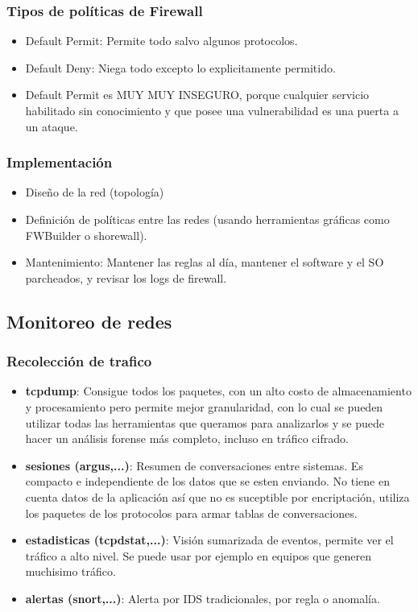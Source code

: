 \subsubsection{Tipos de políticas de Firewall}

\begin{itemize}
	\item Default Permit: Permite todo salvo algunos protocolos.
	\item Default Deny: Niega todo excepto lo explicitamente permitido.
	\item Default Permit es MUY MUY INSEGURO, porque cualquier servicio habilitado sin conocimiento y que posee
	una vulnerabilidad es una puerta a un ataque.
\end{itemize}

\subsubsection{Implementación}

\begin{itemize}
	\item Diseño de la red (topología)
	\item Definición de políticas entre las redes (usando herramientas gráficas como FWBuilder o shorewall).
	\item Mantenimiento: Mantener las reglas al día, mantener el software y el SO parcheados, y revisar los logs de firewall.
\end{itemize}

\subsection{Monitoreo de redes}

\subsubsection{Recolección de trafico}

\begin{itemize}
	\item \textbf{tcpdump}: Consigue todos los paquetes, con un alto costo de almacenamiento y procesamiento pero permite mejor granularidad, con lo
	cual se pueden utilizar todas las herramientas que queramos para analizarlos y se puede hacer un análisis forense más completo, incluso en
	tráfico cifrado.
	\item \textbf{sesiones (argus,...)}: Resumen de conversaciones entre sistemas. Es compacto e independiente de los datos que se esten enviando.
	No tiene en cuenta datos de la aplicación así que no es suceptible por encriptación, utiliza los paquetes de los protocolos para armar tablas de
	conversaciones.
	\item \textbf{estadisticas (tcpdstat,...)}: Visión sumarizada de eventos, permite ver el tráfico a alto nivel. Se puede usar por ejemplo en equipos
	que generen muchisimo tráfico.
	\item \textbf{alertas (snort,...)}: Alerta por IDS tradicionales, por regla o anomalía.
\end{itemize}

